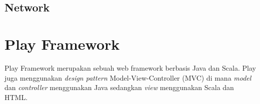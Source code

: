 \subsection{Network}

\section{Play Framework}
\label{sec:play}

Play Framework \cite{Leroux:2014} merupakan sebuah web framework berbasis Java dan Scala. Play juga menggunakan \textit{design pattern} Model-View-Controller (MVC) di mana \textit{model} dan \textit{controller} menggunakan Java sedangkan \textit{view} menggunakan Scala dan HTML. 
